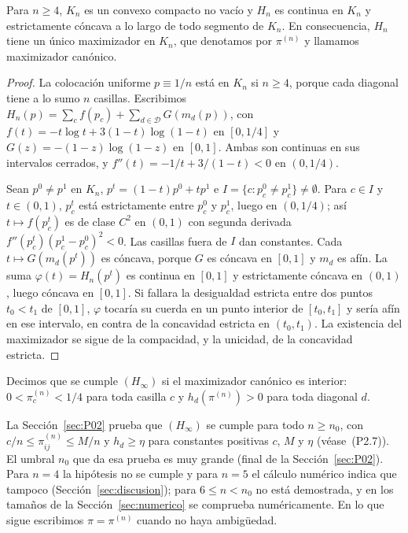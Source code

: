 \begin{lema}\label{lem:maximizador}
Para $n\ge4$, $K_n$ es un convexo compacto no vacío y $H_n$ es continua en $K_n$ y estrictamente cóncava
a lo largo de todo segmento de $K_n$. En consecuencia, $H_n$ tiene un único maximizador en $K_n$, que
denotamos por $\pi^{(n)}$ y llamamos maximizador canónico.
\end{lema}
\begin{proof}
La colocación uniforme $p\equiv1/n$ está en $K_n$ si $n\ge4$, porque cada diagonal tiene a lo sumo $n$
casillas. Escribimos $H_n(p)=\sum_cf(p_c)+\sum_{d\in\mathcal D}G(m_d(p))$, con
$f(t)=-t\log t+3(1-t)\log(1-t)$ en $[0,1/4]$ y $G(z)=-(1-z)\log(1-z)$ en $[0,1]$. Ambas son continuas en
sus intervalos cerrados, y $f''(t)=-1/t+3/(1-t)<0$ en $(0,1/4)$.

Sean $p^0\ne p^1$ en $K_n$, $p^t=(1-t)p^0+tp^1$ e $I=\{c:p^0_c\ne p^1_c\}\ne\emptyset$. Para $c\in I$ y
$t\in(0,1)$, $p^t_c$ está estrictamente entre $p^0_c$ y $p^1_c$, luego en $(0,1/4)$; así
$t\mapsto f(p^t_c)$ es de clase $C^2$ en $(0,1)$ con segunda derivada $f''(p^t_c)(p^1_c-p^0_c)^2<0$.
Las casillas fuera de $I$ dan constantes. Cada $t\mapsto G(m_d(p^t))$ es cóncava, porque $G$ es cóncava
en $[0,1]$ y $m_d$ es afín. La suma $\varphi(t)=H_n(p^t)$ es continua en $[0,1]$ y estrictamente cóncava
en $(0,1)$, luego cóncava en $[0,1]$. Si fallara la desigualdad estricta entre dos puntos
$t_0<t_1$ de $[0,1]$, $\varphi$ tocaría su cuerda en un punto interior de $[t_0,t_1]$ y sería afín en
ese intervalo, en contra de la concavidad estricta en $(t_0,t_1)$. La existencia del maximizador se sigue
de la compacidad, y la unicidad, de la concavidad estricta.
\end{proof}

\begin{definicion}\label{def:Hinf}
Decimos que se cumple $(H_\infty)$ si el maximizador canónico es interior:
$0<\pi^{(n)}_c<1/4$ para toda casilla $c$ y $h_d(\pi^{(n)})>0$ para toda diagonal $d$.
\end{definicion}

La Sección~\ref{sec:P02} prueba que $(H_\infty)$ se cumple para todo $n\ge n_0$, con
$c/n\le\pi^{(n)}_{ij}\le M/n$ y $h_d\ge\eta$ para constantes positivas $c$, $M$ y $\eta$
(véase~(P2.7)). El umbral $n_0$ que da esa prueba es muy grande (final de la Sección~\ref{sec:P02}).
Para $n=4$ la hipótesis no se cumple y para $n=5$ el cálculo numérico indica que tampoco
(Sección~\ref{sec:discusion}); para $6\le n<n_0$ no está demostrada, y en los tamaños de la
Sección~\ref{sec:numerico} se comprueba numéricamente.
En lo que sigue escribimos $\pi=\pi^{(n)}$ cuando no haya ambigüedad.

